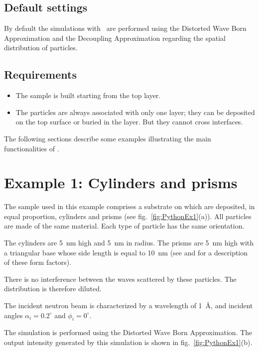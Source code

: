 \subsection{Default settings}
By default the simulations with \BornAgain\ are performed using the Distorted Wave Born Approximation and the Decoupling Approximation regarding the spatial distribution of particles.


\subsection{Requirements}
\begin{itemize}
  \item The sample is built starting from the top layer.
  \item The particles are always associated with only one layer; they can be deposited on the top surface or buried in the layer. But they cannot cross interfaces.
\end{itemize}
The following sections describe some examples illustrating the main functionalities of \BornAgain .


\newpage
\section{Example 1: Cylinders and prisms}
The sample used in this example comprises a substrate on which are deposited, in equal proportion, cylinders and prisms (see fig.~\ref{fig:PythonEx1}(a)). All particles are made of the same material. Each type of particle has the same orientation.

The cylinders are 5~nm high and 5~nm in radius. The prisms are 5~nm high with a triangular base whose side length is equal to 10~nm (see  and  for a description of these form factors). 

There is no interference between the waves scattered by these particles. The distribution is therefore diluted.

The incident neutron beam is characterized by a wavelength of 1~\AA, and incident angles $\alpha_i=0.2^{\circ}$ and $\phi_i=0^{\circ}$.

The simulation is performed using the Distorted Wave Born Approximation. The output intensity generated by this simulation is shown in fig.~\ref{fig:PythonEx1}(b).

